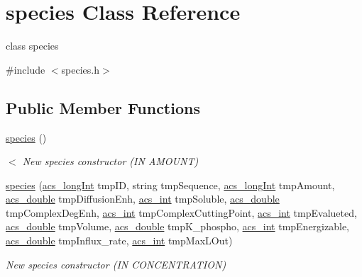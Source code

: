 \hypertarget{a00022}{\section{species Class Reference}
\label{a00022}
}


class species  




{\ttfamily \#include $<$species.\-h$>$}

\subsection*{Public Member Functions}
\begin{DoxyCompactItemize}
\item 
\hyperlink{a00022_a25887c42dfb4b6f33a2d17fdcf74bc47}{species} ()
\begin{DoxyCompactList}\small\item\em $<$ New species constructor (I\-N A\-M\-O\-U\-N\-T) \end{DoxyCompactList}\item 
\hyperlink{a00022_a2c407091ff53f0d508b7b9ed8230eee4}{species} (\hyperlink{a00024_a19319d75f02db4308bc5c0026d98cd85}{acs\-\_\-long\-Int} tmp\-I\-D, string tmp\-Sequence, \hyperlink{a00024_a19319d75f02db4308bc5c0026d98cd85}{acs\-\_\-long\-Int} tmp\-Amount, \hyperlink{a00024_ab776853a005fcbf56af0424a2a4dd607}{acs\-\_\-double} tmp\-Diffusion\-Enh, \hyperlink{a00024_a8d277355641a098190360234e2ebde35}{acs\-\_\-int} tmp\-Soluble, \hyperlink{a00024_ab776853a005fcbf56af0424a2a4dd607}{acs\-\_\-double} tmp\-Complex\-Deg\-Enh, \hyperlink{a00024_a8d277355641a098190360234e2ebde35}{acs\-\_\-int} tmp\-Complex\-Cutting\-Point, \hyperlink{a00024_a8d277355641a098190360234e2ebde35}{acs\-\_\-int} tmp\-Evalueted, \hyperlink{a00024_ab776853a005fcbf56af0424a2a4dd607}{acs\-\_\-double} tmp\-Volume, \hyperlink{a00024_ab776853a005fcbf56af0424a2a4dd607}{acs\-\_\-double} tmp\-K\-\_\-phospho, \hyperlink{a00024_a8d277355641a098190360234e2ebde35}{acs\-\_\-int} tmp\-Energizable, \hyperlink{a00024_ab776853a005fcbf56af0424a2a4dd607}{acs\-\_\-double} tmp\-Influx\-\_\-rate, \hyperlink{a00024_a8d277355641a098190360234e2ebde35}{acs\-\_\-int} tmp\-Max\-L\-Out)
\begin{DoxyCompactList}\small\item\em New species constructor (I\-N C\-O\-N\-C\-E\-N\-T\-R\-A\-T\-I\-O\-N) \end{DoxyCompactList}\item 

\end{DoxyCompactItemize}

